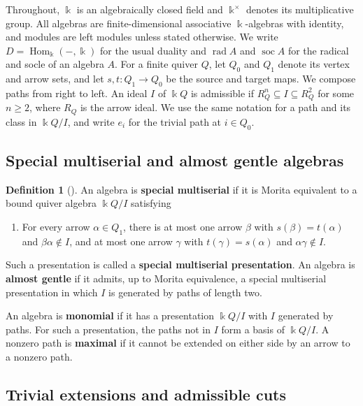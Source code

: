 \documentclass[11pt]{article}
\DeclareMathOperator{\soc}{soc}
\DeclareMathOperator{\rad}{rad}
\DeclareMathOperator{\Hom}{Hom}
\newcommand{\defn}[1]{\textbf{#1}}
\theoremstyle{definition}
\newtheorem{definition}[theorem]{Definition}
\begin{document}
	Throughout, $\Bbbk$ is an algebraically closed field and $\Bbbk^\times$ denotes its multiplicative group.
	All algebras are finite-dimensional associative $\Bbbk$-algebras with identity, and modules are left modules unless stated otherwise.
	We write $D=\Hom_\Bbbk(-,\Bbbk)$ for the usual duality and $\rad A$ and $\soc A$ for the radical and socle of an algebra $A$.
	For a finite quiver $Q$, let $Q_0$ and $Q_1$ denote its vertex and arrow sets, and let $s,t:Q_1\to Q_0$ be the source and target maps.
	We compose paths from right to left.
	An ideal $I$ of $\Bbbk Q$ is admissible if $R^n_Q\subseteq I\subseteq R_Q^2$ for some $n\geq2$, where $R_Q$ is the arrow ideal. 
	We use the same notation for a path and its class in $\Bbbk Q/I$, and write $e_i$ for the trivial path at $i\in Q_0$.

	\subsection{Special multiserial and almost gentle algebras}
	
		\begin{definition}[{\cite{vonHohneWaschbusch,GreenSchrollMultiserial,GreenSchrollAlmost}}]
			\label{def:special-multiserial}
			\label{def:almost-gentle}
			An algebra is \defn{special multiserial} if it is Morita equivalent to a bound quiver algebra $\Bbbk Q/I$ satisfying
			\begin{enumerate}
				\item[$(M)$] For every arrow $\alpha\in Q_1$, there is at most one arrow $\beta$ with $s(\beta)=t(\alpha)$ and $\beta\alpha\notin I$, and at most one arrow $\gamma$ with $t(\gamma)=s(\alpha)$ and $\alpha\gamma\notin I$.
			\end{enumerate}
			Such a presentation is called a \defn{special multiserial presentation}.
			An algebra is \defn{almost gentle} if it admits, up to Morita equivalence, a special multiserial presentation in which $I$ is generated by paths of length two.
		\end{definition}


		An algebra is \defn{monomial} if it has a presentation $\Bbbk Q/I$ with $I$ generated by paths.
		For such a presentation, the paths not in $I$ form a basis of $\Bbbk Q/I$.
		A nonzero path is \defn{maximal} if it cannot be extended on either side by an arrow to a nonzero path.

	\subsection{Trivial extensions and admissible cuts}
	\label{subsec:cycles}
\end{document}
